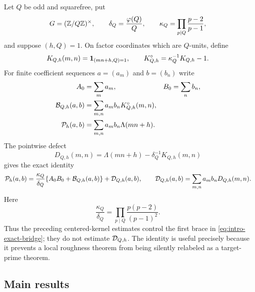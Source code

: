 Let $Q$ be odd and squarefree, put
\[
 G=(\mathbb Z/Q\mathbb Z)^\times,
 \qquad
 \delta_Q=\frac{\varphi(Q)}Q,
 \qquad
 \kappa_Q=\prod_{p\mid Q}\frac{p-2}{p-1},
\]
and suppose $(h,Q)=1$.  On factor coordinates which are $Q$-units, define
\[
 K_{Q,h}(m,n)=\mathbf 1_{(mn+h,Q)=1},
 \qquad
 K_{Q,h}^{\circ}=\kappa_Q^{-1}K_{Q,h}-1.
\]
For finite coefficient sequences $a=(a_m)$ and $b=(b_n)$ write
\begin{align}
 A_0&=\sum_m a_m,& B_0&=\sum_n b_n,\label{eq:intro-masses}\\
 \mathcal B_{Q,h}(a,b)&=\sum_{m,n}a_mb_nK_{Q,h}^{\circ}(m,n),\label{eq:intro-centered-form}\\
 \mathcal P_h(a,b)&=\sum_{m,n}a_mb_n\Lambda(mn+h).\label{eq:intro-prime-target-form}
\end{align}
The pointwise defect
\begin{equation}\label{eq:intro-defect}
 D_{Q,h}(m,n)
 =\Lambda(mn+h)-\delta_Q^{-1}K_{Q,h}(m,n)
\end{equation}
gives the exact identity
\begin{equation}\label{eq:intro-exact-bridge}
 \mathcal P_h(a,b)
 =\frac{\kappa_Q}{\delta_Q}
  \{A_0B_0+\mathcal B_{Q,h}(a,b)\}
  +\mathcal D_{Q,h}(a,b),
 \qquad
 \mathcal D_{Q,h}(a,b)=\sum_{m,n}a_mb_nD_{Q,h}(m,n).
\end{equation}
Here
\begin{equation}\label{eq:intro-local-factor}
 \frac{\kappa_Q}{\delta_Q}
 =\prod_{p\mid Q}\frac{p(p-2)}{(p-1)^2}.
\end{equation}
Thus the preceding centered-kernel estimates control the first brace in
\eqref{eq:intro-exact-bridge}; they do not estimate $\mathcal D_{Q,h}$.  The
identity is useful precisely because it prevents a local roughness theorem
from being silently relabeled as a target-prime theorem.

\subsection{Main results}

